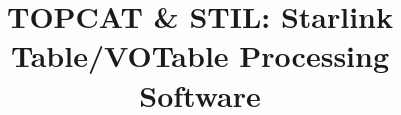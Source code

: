 \documentclass[11pt,twoside]{article}  %
\begin{document}

%
%
%


%
% 
%
%

\title{TOPCAT \& STIL: Starlink Table/VOTable Processing Software}

%
%
%
\end{document}
